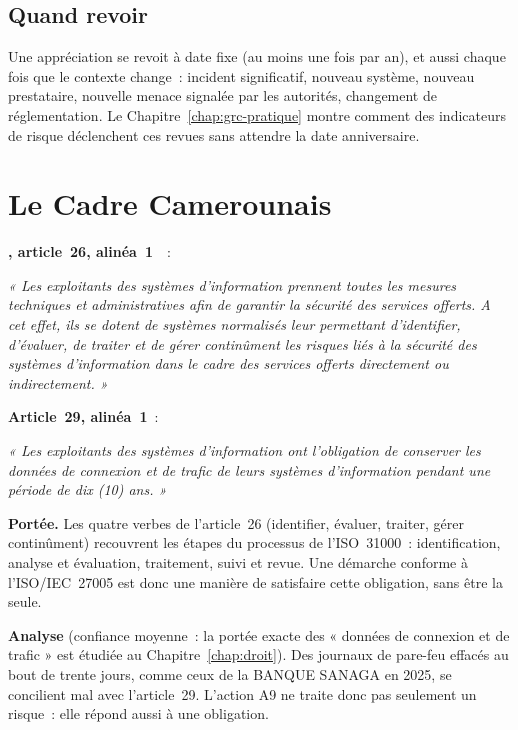 \subsection{Quand revoir}

Une appréciation se revoit à date fixe (au moins une fois par an), et
aussi chaque fois que le contexte change~: incident significatif, nouveau
système, nouveau prestataire, nouvelle menace signalée par les autorités,
changement de réglementation. Le Chapitre~\ref{chap:grc-pratique} montre
comment des indicateurs de risque déclenchent ces revues sans attendre la
date anniversaire.

\section{Le Cadre Camerounais}
\label{sec:c03-cadre}

\begin{boxjuris}
\textbf{, article~26, alinéa~1}~\cite{loi2010012}~:

\medskip
\textit{« Les exploitants des systèmes d'information prennent toutes les
mesures techniques et administratives afin de garantir la sécurité des
services offerts. A cet effet, ils se dotent de systèmes normalisés leur
permettant d'identifier, d'évaluer, de traiter et de gérer continûment les
risques liés à la sécurité des systèmes d'information dans le cadre des
services offerts directement ou indirectement. »}

\medskip
\textbf{Article~29, alinéa~1}~:

\medskip
\textit{« Les exploitants des systèmes d'information ont l'obligation de
conserver les données de connexion et de trafic de leurs systèmes
d'information pendant une période de dix (10) ans. »}

\medskip
\textbf{Portée.} Les quatre verbes de l'article~26 (identifier, évaluer,
traiter, gérer continûment) recouvrent les étapes du processus de
l'ISO~31000~: identification, analyse et évaluation, traitement, suivi et
revue. Une démarche conforme à l'ISO/IEC~27005 est donc une manière de
satisfaire cette obligation, sans être la seule.

\medskip
\textbf{Analyse} (confiance moyenne~: la portée exacte des « données de
connexion et de trafic » est étudiée au Chapitre~\ref{chap:droit}). Des
journaux de pare-feu effacés au bout de trente jours, comme ceux de la
BANQUE SANAGA en 2025, se concilient mal avec l'article~29. L'action A9 ne
traite donc pas seulement un risque~: elle répond aussi à une obligation.
\end{boxjuris}

